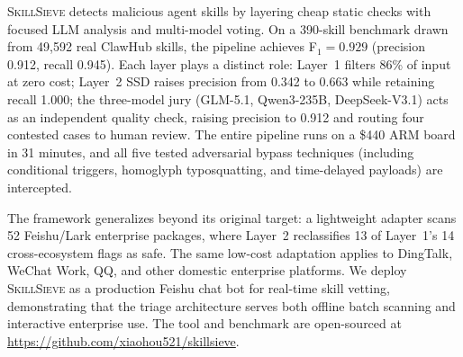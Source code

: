 \documentclass[sigconf,nonacm]{acmart}
\begin{document}
\textsc{SkillSieve} detects malicious agent skills by layering cheap static checks with focused LLM analysis and multi-model voting. On a 390-skill benchmark drawn from 49,592 real ClawHub skills, the pipeline achieves F$_1=0.929$ (precision 0.912, recall 0.945). Each layer plays a distinct role: Layer~1 filters 86\% of input at zero cost; Layer~2 SSD raises precision from 0.342 to 0.663 while retaining recall 1.000; the three-model jury (GLM-5.1, Qwen3-235B, DeepSeek-V3.1) acts as an independent quality check, raising precision to 0.912 and routing four contested cases to human review. The entire pipeline runs on a \$440 ARM board in 31 minutes, and all five tested adversarial bypass techniques (including conditional triggers, homoglyph typosquatting, and time-delayed payloads) are intercepted.

The framework generalizes beyond its original target: a lightweight adapter scans 52 Feishu/Lark enterprise packages, where Layer~2 reclassifies 13 of Layer~1's 14 cross-ecosystem flags as safe. The same low-cost adaptation applies to DingTalk, WeChat Work, QQ, and other domestic enterprise platforms. We deploy \textsc{SkillSieve} as a production Feishu chat bot for real-time skill vetting, demonstrating that the triage architecture serves both offline batch scanning and interactive enterprise use. The tool and benchmark are open-sourced at \url{https://github.com/xiaohou521/skillsieve}.
\end{document}
